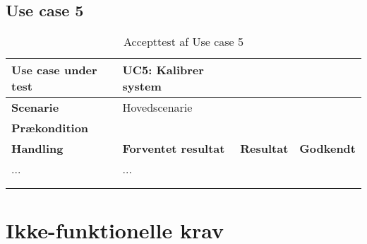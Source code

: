 
\newpage

\subsection{Use case 5}
\begin{longtabu} to 
\midrule
\textbf{Use case under test} & UC5: Kalibrer system \\
\midrule
\textbf{Scenarie} & Hovedscenarie\\
\midrule
\textbf{Prækondition} & \\
\midrule
\textbf{Handling} &    \textbf{Forventet resultat} & \textbf{Resultat}	&    \textbf{Godkendt}\\[-1ex]
    \midrule
   ... &    ... &    \\
   \midrule
\caption{Accepttest af Use case 5}\\
\label{AT_UC5}
\end{longtabu}

\newpage

\section{Ikke-funktionelle krav}

